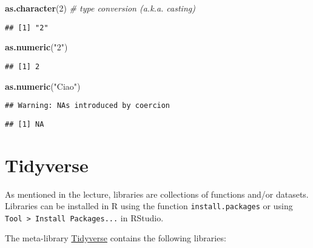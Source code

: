 \documentclass[
]{book}
\newenvironment{Shaded}{\begin{snugshade}}{\end{snugshade}}
\newcommand{\CommentTok}[1]{\textcolor[rgb]{0.56,0.35,0.01}{\textit{#1}}}
\newcommand{\DecValTok}[1]{\textcolor[rgb]{0.00,0.00,0.81}{#1}}
\newcommand{\KeywordTok}[1]{\textcolor[rgb]{0.13,0.29,0.53}{\textbf{#1}}}
\newcommand{\NormalTok}[1]{#1}
\newcommand{\StringTok}[1]{\textcolor[rgb]{0.31,0.60,0.02}{#1}}
\begin{document}
\begin{Shaded}
\begin{Highlighting}[]
\KeywordTok{as.character}\NormalTok{(}\DecValTok{2}\NormalTok{) }\CommentTok{# type conversion  (a.k.a. casting)}
\end{Highlighting}
\end{Shaded}

\begin{verbatim}
## [1] "2"
\end{verbatim}

\begin{Shaded}
\begin{Highlighting}[]
\KeywordTok{as.numeric}\NormalTok{(}\StringTok{"2"}\NormalTok{)}
\end{Highlighting}
\end{Shaded}

\begin{verbatim}
## [1] 2
\end{verbatim}

\begin{Shaded}
\begin{Highlighting}[]
\KeywordTok{as.numeric}\NormalTok{(}\StringTok{"Ciao"}\NormalTok{)}
\end{Highlighting}
\end{Shaded}

\begin{verbatim}
## Warning: NAs introduced by coercion
\end{verbatim}

\begin{verbatim}
## [1] NA
\end{verbatim}

\hypertarget{tidyverse}{%
\section{Tidyverse}\label{tidyverse}}

As mentioned in the lecture, libraries are collections of functions and/or datasets. Libraries can be installed in R using the function \texttt{install.packages} or using \texttt{Tool\ \textgreater{}\ Install\ Packages...} in RStudio.

The meta-library \href{https://www.tidyverse.org/}{Tidyverse} contains the following libraries:
\end{document}
